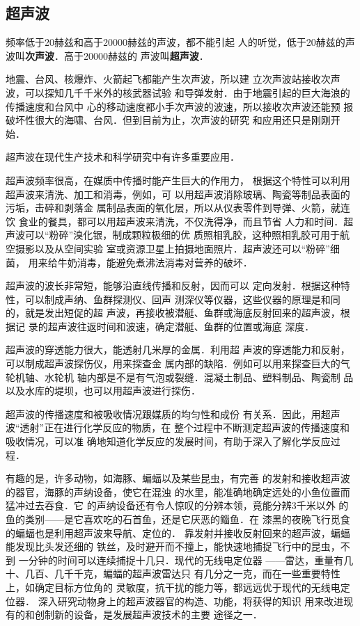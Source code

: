 \subsection{超声波}
频率低于20赫兹和高于20000赫兹的声波，都不能引起
人的听觉，低于20赫兹的声波叫\textbf{次声波}．高于20000赫兹的
声波叫\textbf{超声波}．

地震、台风、核爆炸、火箭起飞都能产生次声波，所以建
立次声波站接收次声波，可以探知几千千米外的核武器试验
和导弹发射．由于地震引起的巨大海浪的传播速度和台风中
心的移动速度都小手次声波的波速，所以接收次声波还能预
报破坏性很大的海啸、台风．但到目前为止，次声波的研究
和应用还只是刚刚开始．

超声波在现代生产技术和科学研究中有许多重要应用．

超声波频率很高，在媒质中传播时能产生巨大的作用力，
根据这个特性可以利用超声波来清洗、加工和消毒，例如，可
以用超声波消除玻璃、陶瓷等制品表面的污垢，击碎和剥落金
属制品表面的氧化层，所以从仪表零件到导弹、火箭，就连饮
食业的餐具，都可以用超声波来清洗，不仅洗得净，而且节省
人力和时间．超声波可以“粉碎”溴化银，制成颗粒极细的优
质照相乳胶，这种照相乳胶可用于航空摄影以及从空间实验
室或资源卫星上拍摄地面照片．超声波还可以“粉碎”细菌，
用来给牛奶消毒，能避免煮沸法消毒对营养的破坏．

超声波的波长非常短，能够沿直线传播和反射，因而可以
定向发射．根据这种特性，可以制成声纳、鱼群探测仪、回声
测深仪等仪器，这些仪器的原理是和同的，就是发出短促的超
声波，再接收被潜艇、鱼群或海底反射回来的超声波，根据记
录的超声波往返时间和波速，确定潜艇、鱼群的位置或海底
深度．

超声波的穿透能力很大，能透射几米厚的金属．利用超
声波的穿透能力和反射，可以制成超声波探伤仪，用来探查金
属内部的缺陷．例如可以用来探查巨大的气轮机轴、水轮机
轴内部是不是有气泡或裂缝．混凝土制品、塑料制品、陶瓷制
品以及水库的堤坝，也可以用超声波进行探伤．

超声波的传播速度和被吸收情况跟媒质的均匀性和成份
有关系．因此，用超声波“透射”正在进行化学反应的物质，在
整个过程中不断测定超声波的传播速度和吸收情况，可以准
确地知道化学反应的发展时间，有助于深入了解化学反应过
程．

有趣的是，许多动物，如海豚、蝙蝠以及某些昆虫，有完善
的发射和接收超声波的器官，海豚的声纳设备，使它在混浊
的水里，能准确地确定远处的小鱼位置而猛冲过去吞食．它
的声纳设备还有令人惊叹的分辨本领，竟能分辨3千米以外
的鱼的类别——是它喜欢吃的石首鱼，还是它厌恶的鲻鱼．在
漆黑的夜晚飞行觅食的蝙蝠也是利用超声波来导航、定位的．
靠发射并接收反射回来的超声波，蝙蝠能发现比头发还细的
铁丝，及时避开而不撞上，能快速地捕捉飞行中的昆虫，不到
一分钟的时间可以连续捕捉十几只．现代的无线电定位器
——雷达，重量有几十、几百、几千千克，蝙蝠的超声波雷达只
有几分之一克，而在一些重要特性上，如确定目标方位角的
灵敏度，抗干扰的能力等，都远远优于现代的无线电定位器．
深入研究动物身上的超声波器官的构造、功能，将获得的知识
用来改进现有的和创制新的设备，是发展超声波技术的主要
途径之一．
\newpage
